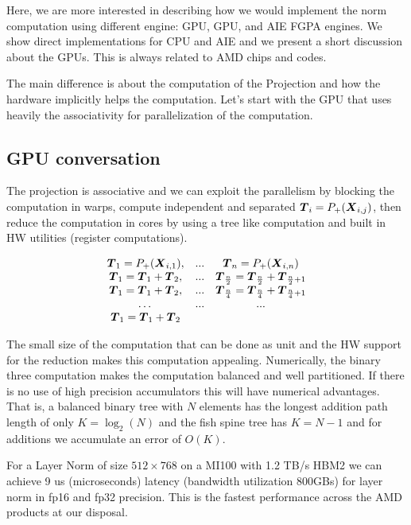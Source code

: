 \documentclass[acmsmall]{acmart}
\begin{document}
Here, we are more interested in describing how we would implement the
norm computation using different engine: GPU, GPU, and AIE FGPA
engines. We show direct implementations for CPU and AIE and we present
a short discussion about the GPUs. This is always related to AMD chips
and codes.

The main difference is about the computation of the Projection and how
the hardware implicitly helps the computation. Let's start with the
GPU that uses heavily the associativity for parallelization of the
computation.

\subsection{GPU conversation}
The projection is associative and we can exploit the parallelism by
blocking the computation in warps, compute independent and separated
${\boldsymbol T}_i = P_+({\boldsymbol X}_{i,j})$, then reduce the computation in cores
by using a tree like computation and built in HW utilities (register
computations). 

\begin{equation}
  \begin{matrix}
    {\boldsymbol T}_1 = P_+({\boldsymbol X}_{i,1}), & ... &  {\boldsymbol T}_n = P_+({\boldsymbol X}_{i,n}) \\ 
    {\boldsymbol T}_1 = {\boldsymbol T}_1+{\boldsymbol T}_2, & ... &  {\boldsymbol T}_{\frac{n}{2}} = {\boldsymbol T}_{\frac{n}{2}} + {\boldsymbol T}_{\frac{n}{2}+1} \\
    {\boldsymbol T}_1 = {\boldsymbol T}_1 + {\boldsymbol T}_2, & ... &  {\boldsymbol T}_{\frac{n}{4}} = {\boldsymbol T}_{\frac{n}{4}} + {\boldsymbol T}_{\frac{n}{4}+1} \\
    \dots  & ... & ... \\ 
    {\boldsymbol T}_1 = {\boldsymbol T}_1 + {\boldsymbol T}_2 & & \\
  \end{matrix}
\end{equation}

The small size of the computation that can be done as unit and the HW
support for the reduction makes this computation
appealing. Numerically, the binary three computation makes the
computation balanced and well partitioned. If there is no use of high
precision accumulators this will have numerical advantages. That is, a
balanced binary tree with $N$ elements has the longest addition path
length of only $K = \log_2(N)$ and the fish spine tree has $K = N-1$
and for additions we accumulate an error of $O(K)$.

For a Layer Norm of size $512 \times 768$ on a MI100 with 1.2 TB/s
HBM2 we can achieve 9 us (microseconds) latency (bandwidth utilization
800GBs) for layer norm in fp16 and fp32 precision. This is the fastest
performance across the AMD products at our disposal.
\end{document}
